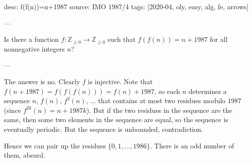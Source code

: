 desc: f(f(n))=n+1987
source: IMO 1987/4
tags: [2020-04, oly, easy, alg, fe, arrows]

---

Is there a function $f:\mathbb Z_{\ge0}\to\mathbb Z_{\ge0}$ such that $f(f(n))=n+1987$ for all nonnegative integers $n$?

---

The answer is no. Clearly $f$ is injective. Note that $f(n+1987)=f(f(f(n)))=f(n)+1987$, so each $n$ determines a sequence $n$, $f(n)$, $f^2(n)$, $\ldots$ that contains at most two residues modulo $1987$ (since $f^{2k}(n)=n+1987k$). But if the two residues in the sequence are the same, then some two elements in the sequence are equal, so the sequence is eventually periodic. But the sequence is unbounded, contradiction.

Hence we can pair up the residues $\{0,1,\ldots,1986\}$. There is an odd number of them, absurd.
